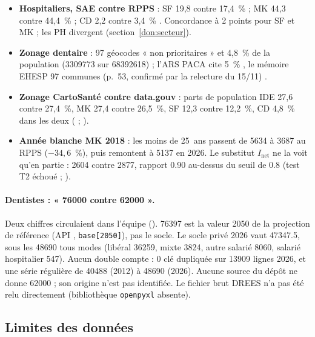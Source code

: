 \begin{itemize}
  1/1/2025 ($+0{,}4$~\%\derive) \citep{d-ordre2025demo}.
  \item \textbf{Hospitaliers, SAE contre RPPS} : SF 19,8 contre 17,4~\%\mesure{} ; MK 44,3 contre
  44,4~\%\mesure{} ; CD 2,2 contre 3,4~\%\mesure{} \citep{d-sae708}. Concordance à 2\derive{} points pour SF et
  MK ; les PH divergent (section~\ref{don:secteur}).
  \item \textbf{Zonage dentaire} : 97\mesure{} géocodes « non prioritaires » et 4,8~\%\mesure{} de la population
  (\num{3309773} sur \num{68392618}\mesure) ; l'ARS PACA cite 5~\%\mesure{} \citep{d-arspaca2025cd}, le mémoire
  EHESP 97\mesure{} communes (p.~53, confirmé par la relecture du 15/11) \citep{d-bahroun2025}.
  \item \textbf{Zonage CartoSanté contre data.gouv} : parts de population IDE 27,6 contre 27,4~\%, MK 27,4
  contre 26,5~\%, SF 12,3 contre 12,2~\%, CD 4,8~\% dans les deux\mesure{} ( ;
  \citep{d-zonagesdatagouv}).
  \item \textbf{Année blanche MK 2018} \citep{d-er1159} : les moins de 25~ans passent de \num{5634} à
  \num{3687}\mesure{} au RPPS ($-34{,}6$~\%\derive), puis remontent à \num{5137}\mesure{} en 2026. Le substitut
  $I_{\mathrm{net}}$ ne la voit qu'en partie : \num{2604} contre \num{2877}\mesure{}, rapport
  \num{0.90}\derive{} au-dessus du seuil de \num{0.8}\suppose{} (test T2 échoué ; ).
\end{itemize}

\paragraph{Dentistes : « \num{76000} contre \num{62000} ».} Deux chiffres circulaient dans l'équipe
(). \num{76397}\mesure{} est la valeur 2050 de la projection de référence (API
, \texttt{base[2050]}), pas le socle. Le socle privé 2026 vaut \num{47347.5}\mesure{},
sous les \num{48690}\mesure{} tous modes (libéral \num{36259}, mixte \num{3824}, autre salarié \num{8060},
salarié hospitalier \num{547}\mesure). Aucun double compte : 0\mesure{} clé dupliquée sur \num{13909}\mesure{}
lignes 2026, et une série régulière de \num{40488}\mesure{} (2012) à \num{48690}\mesure{} (2026). Aucune
source du dépôt ne donne \num{62000} ; son origine n'est pas identifiée. Le fichier brut DREES n'a pas été relu
directement (bibliothèque \texttt{openpyxl} absente).

\subsection{Limites des données}\label{don:limites}

